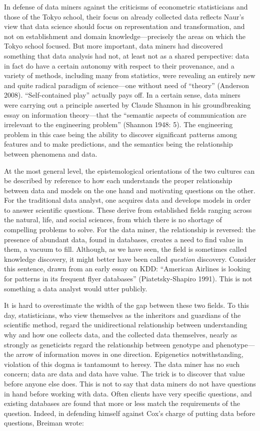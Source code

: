 \documentclass[
  letterpaper,
]{report}
\begin{document}
In defense of data miners against the criticisms of econometric
statisticians and those of the Tokyo school, their focus on already
collected data reflects Naur's view that data science should focus on
representation and transformation, and not on establishment and domain
knowledge---precisely the areas on which the Tokyo school focused. But
more important, data miners had discovered something that data analysis
had not, at least not as a shared perspective: data in fact do have a
certain autonomy with respect to their provenance, and a variety of
methods, including many from statistics, were revealing an entirely new
and quite radical paradigm of science---one without need of ``theory''
(Anderson 2008). ``Self-contained play'' actually pays off. In a certain
sense, data miners were carrying out a principle asserted by Claude
Shannon in his groundbreaking essay on information theory---that the
``semantic aspects of communication are irrelevant to the engineering
problem'' (Shannon 1948: 5). The engineering problem in this case being
the ability to discover significant patterns among features and to make
predictions, and the semantics being the relationship between phenomena
and data.

At the most general level, the epistemological orientations of the two
cultures can be described by reference to how each understands the
proper relationship between data and models on the one hand and
motivating questions on the other. For the traditional data analyst, one
acquires data and develops models in order to answer scientific
questions. These derive from established fields ranging across the
natural, life, and social sciences, from which there is no shortage of
compelling problems to solve. For the data miner, the relationship is
reversed: the presence of abundant data, found in databases, creates a
need to find value in them, a vacuum to fill. Although, as we have seen,
the field is sometimes called knowledge discovery, it might better have
been called \emph{question} discovery. Consider this sentence, drawn
from an early essay on KDD: ``American Airlines is looking for patterns
in its frequent flyer databases'' (Piatetsky-Shapiro 1991). This is not
something a data analyst would utter publicly.

It is hard to overestimate the width of the gap between these two
fields. To this day, statisticians, who view themselves as the
inheritors and guardians of the scientific method, regard the
unidirectional relationship between understanding why and how one
collects data, and the collected data themselves, nearly as strongly as
geneticists regard the relationship between genotype and phenotype---the
arrow of information moves in one direction. Epigenetics
notwithstanding, violation of this dogma is tantamount to heresy. The
data miner has no such concern; data are data and data have value. The
trick is to discover that value before anyone else does. This is not to
say that data miners do not have questions in hand before working with
data. Often clients have very specific questions, and existing databases
are found that more or less match the requirements of the question.
Indeed, in defending himself against Cox's charge of putting data before
questions, Breiman wrote:
\end{document}
